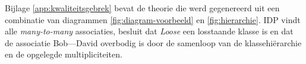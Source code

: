 Bijlage \ref{app:kwaliteitsgebrek} bevat de theorie die werd gegenereerd uit een combinatie van diagrammen \ref{fig:diagram-voorbeeld} en \ref{fig:hierarchie}. IDP
vindt alle \textit{many-to-many} associaties, besluit dat \textit{Loose} een losstaande klasse is en dat de associatie Bob---David overbodig is door de samenloop van de klassehi\"erarchie en de opgelegde multipliciteiten.
